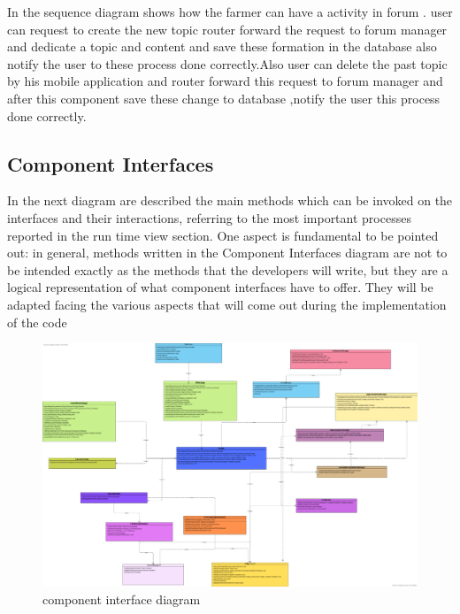 In the sequence diagram shows how the farmer can have a activity in forum .
user can request to create the new topic router forward the request to forum manager and dedicate  a topic and content and save these formation in the  database also notify the user to these process done correctly.Also user can delete the past topic by his mobile application and router forward this request to forum manager and after this component save these change to database ,notify the user this process done correctly.    

\subsection{Component Interfaces}
In the next diagram are described the main methods which can be invoked on the interfaces and their interactions, referring to the most important processes reported in the run time view section.\newline
One aspect is fundamental to be pointed out: in general, methods written in the Component Interfaces diagram are not to be intended exactly as the methods that the developers will write, but they are a logical representation of what component interfaces have to offer. They will be adapted facing the various aspects that will come out during the implementation of the code


\begin{figure}[H]
\includegraphics[angle= 90,width=1\textwidth]{figures/componentView.png}
\caption{\label{fig:student } component interface diagram}
\end{figure}


